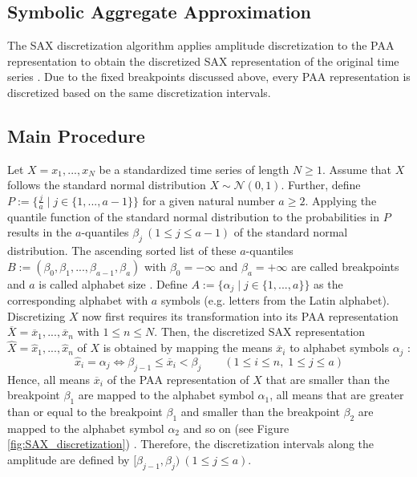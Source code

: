 \subsection{Symbolic Aggregate Approximation}
The \ac{SAX} discretization algorithm applies amplitude discretization to the \ac{PAA} representation to obtain the discretized \ac{SAX} representation of the original time series \cite{SAX_Lin}. Due to the fixed breakpoints discussed above, every \ac{PAA} representation is discretized based on the same discretization intervals.
\subsection*{Main Procedure}
Let $X = x_1, ..., x_N$ be a standardized time series of length $N \geq 1$. Assume that $X$ follows the standard normal distribution $X \sim \mathcal{N}(0,1)$. Further, define $P := \{\frac{j}{a} \mid j \in \{1, ..., a-1\}\}$ for a given natural number $a \geq 2$. Applying the quantile function of the standard normal distribution to the probabilities in $P$ results in the $a$-quantiles $\beta_j \ (1 \leq j \leq a-1)$ of the standard normal distribution. The ascending sorted list of these $a$-quantiles $B := (\beta_0, \beta_1, ..., \beta_{a-1}, \beta_a)$ with $\beta_0 = -\infty$ and $\beta_a = +\infty$ are called breakpoints and $a$ is called alphabet size \cite{SAX_Lin_first}. Define $A := \{\alpha_j \mid j \in \{1, ..., a\}\}$ as the corresponding alphabet with $a$ symbols (e.g. letters from the Latin alphabet). \newline
Discretizing $X$ now first requires its transformation into its \ac{PAA} representation $\overline{X} = \overline{x}_1, ..., \overline{x}_n$ with $1 \leq n \leq N$. Then, the discretized \ac{SAX} representation $\hat{X} = \hat{x}_1, ..., \hat{x}_n$ of $X$ is obtained by mapping the means $\overline{x}_i$ to alphabet symbols $\alpha_j$ \cite{SAX_Lin_first}:
\begin{equation}
\hat{x}_i = \alpha_j \iff \beta_{j-1} \leq \overline{x}_i < \beta_j \qquad (1 \leq i \leq n, \; 1 \leq j \leq a)
\label{eq:SAX_Discretization}
\end{equation}
Hence, all means $\overline{x}_i$ of the \ac{PAA} representation of $X$ that are smaller than the breakpoint $\beta_1$ are mapped to the alphabet symbol $\alpha_1$, all means that are greater than or equal to the breakpoint $\beta_1$ and smaller than the breakpoint $\beta_2$ are mapped to the alphabet symbol $\alpha_2$ and so on (see Figure \ref{fig:SAX_discretization}) \cite{SAX_Lin_first}. Therefore, the discretization intervals along the amplitude are defined by $[\beta_{j-1},\beta_j) \ (1 \leq j \leq a)$. \newline
